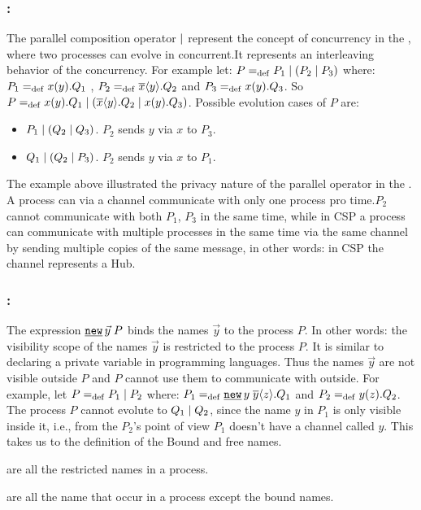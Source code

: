 \subsubsection{:}
The parallel composition operator $\mid$ represent the concept of concurrency in the \picalc{}, where two processes can evolve in concurrent.It represents an interleaving behavior of the concurrency.
For example let:  $P=_{\mathrm{def}}P_1 \mid (P_2 \mid P_3)$ where: $P_1=_{\mathrm{def}}x(y).Q_1$ , $P_2=_{\mathrm{def}}\overline{x}\langle y\rangle.Q_2$ and $P_3=_{\mathrm{def}}x(y).Q_3$. So $P=_{\mathrm{def}}x(y).Q_1 \mid (\overline{x}\langle y\rangle.Q_2 \mid x(y).Q_3)$.
Possible evolution cases of $P$ are:
\begin{itemize}
\item $P_1 \mid (Q_2 \mid Q_3)$. $P_2$ sends $y$ via $x$ to $P_3$.
\item $Q_1 \mid (Q_2 \mid P_3)$. $P_2$ sends $y$ via $x$ to $P_1$.
\end{itemize}

The example above illustrated the privacy nature of the parallel operator in the \picalc{}. A process can via a channel communicate with only one process pro time.$P_2$ cannot communicate with both $P_1$, $P_3$ in the same time, while in \gls{CSP} a process can communicate with multiple processes in the same time via the same channel by sending multiple copies of the same message, in other words: in CSP the channel represents a Hub.


\subsubsection{:}

The expression $\procres{\vec{y}}{P}$ binds the names $\vec{y}$ to the process $P$. In other words: the visibility scope of the  names $\vec{y}$ is restricted to the process $P$. It is similar to declaring a private variable in programming languages. Thus the names $\vec{y}$ are not visible outside $P$ and $P$ cannot use them to communicate with outside. For example, let $P=_{\mathrm{def}}P_1 \mid P_2$ where: $P_1\define\procres{y}{\out{y}{z}.Q_1}$ and $P_2=_{\mathrm{def}}y(z).Q_2$. The process $P$ cannot evolute to $Q_1 \mid Q_2$, since the name $y$ in $P_1$ is only visible inside it, i.e., from the $P_2$'s point of view $P_1$ doesn't have a channel called $y$. This takes us to the definition of the Bound and free names.

\begin{definition}
\label{def_bound_names}
 are all the restricted names in a process.
\end{definition}
\begin{definition}
\label{def_free_names}
 are all the name that occur in a process except the bound names.
\end{definition}

